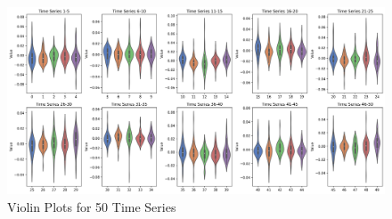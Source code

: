 \begin{figure}[H]
  \centering
  \includegraphics[width=\textwidth]{images/violin_plots_50_timeseries.png}
  \caption{Violin Plots for 50 Time Series}
  \label{fig:violin_plots}
\end{figure}

